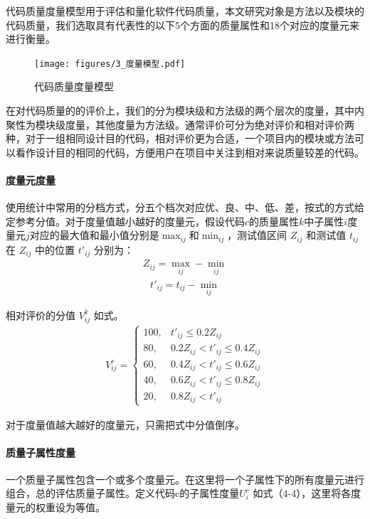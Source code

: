 代码质量度量模型用于评估和量化软件代码质量，本文研究对象是方法以及模块的代码质量，我们选取具有代表性的以下5个方面的质量属性和18个对应的度量元来进行衡量。

\begin{figure}[h]
\centering
\texttt{[image: figures/3\_度量模型.pdf]}
\caption{代码质量度量模型}
\end{figure}

在对代码质量的的评价上，我们的分为模块级和方法级的两个层次的度量，其中内聚性为模块级度量，其他度量为方法级。通常评价可分为绝对评价和相对评价两种，对于一组相同设计目的代码，相对评价更为合适\cite{黄沛杰2011代码质量静态度量的研究与应用}，一个项目内的模块或方法可以看作设计目的相同的代码，方便用户在项目中关注到相对来说质量较差的代码。

\paragraph{度量元度量} 使用统计中常用的分档方式，分五个档次对应优、良、中、低、差，按式的方式给定参考分值。对于度量值越小越好的度量元，假设代码$c$的质量属性$k$中子属性$i$度量元$j$对应的最大值和最小值分别是$\max_{ij}$和$\min_{ij}$，测试值区间 \(Z_{ij}\) 和测试值 \(t_{ij}\) 在 \(Z_{ij}\) 中的位置 \(t'_{ij}\) 分别为：
\begin{align}
Z_{ij} = \max_{ij} - \min_{ij}
\end{align}
\begin{align}
t'_{ij} = t_{ij} - \min_{ij}
\end{align}

相对评价的分值 \(V_{ij}^k\) 如式。
\begin{align}
V_{ij}^c = 
\begin{cases} 
100, & t'_{ij} \leq 0.2Z_{ij} \\ 
80, & 0.2Z_{ij} < t'_{ij} \leq 0.4Z_{ij} \\ 
60, & 0.4Z_{ij} < t'_{ij} \leq 0.6Z_{ij} \\ 
40, & 0.6Z_{ij} < t'_{ij} \leq 0.8Z_{ij} \\ 
20, & 0.8Z_{ij} < t'_{ij}
\end{cases}
\end{align}

对于度量值越大越好的度量元，只需把式中分值倒序。

\paragraph{质量子属性度量} 一个质量子属性包含一个或多个度量元。在这里将一个子属性下的所有度量元进行组合，总的评估质量子属性。定义代码c的子属性度量$U_{i}^c$ 如式（4-4），这里将各度量元的权重设为等值。

